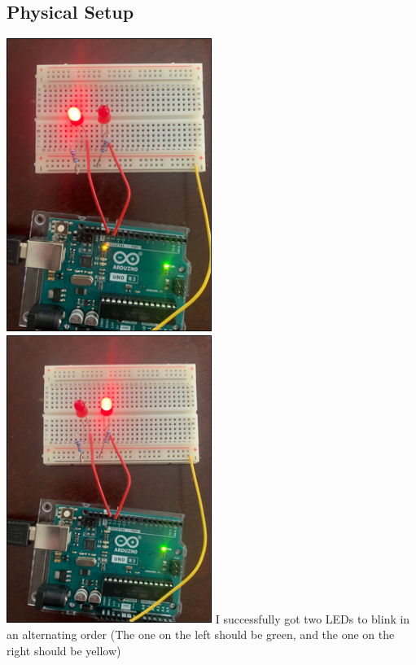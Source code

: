 \documentclass[12pt]{article}
\begin{document}
\subsection{Physical Setup}
\includegraphics[width=0.5\textwidth]{PhysicalTwoLEDOne.png}
\includegraphics[width=0.5\textwidth]{PhysicalTwoLEDTwo.png}
I successfully got two LEDs to blink in an alternating order (The one on the left should be green, and the one on the right should be yellow)
\end{document}
